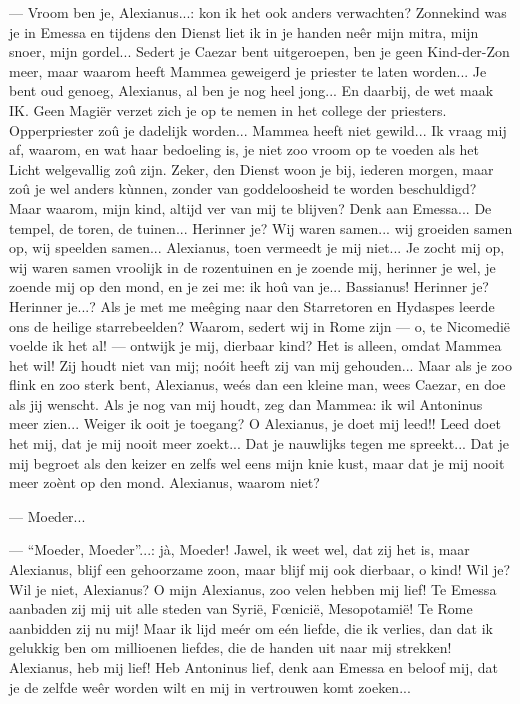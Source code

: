 \documentclass[a4paper, 12pt, oneside, dutch]{article}
\begin{document}
--- Vroom ben je, Alexianus...: kon ik het ook anders verwachten? Zonnekind was je in Emessa en tijdens den Dienst liet ik in je handen neêr mijn mitra, mijn snoer, mijn gordel... Sedert je Caezar bent uitgeroepen, ben je geen Kind-der-Zon meer, maar waarom heeft Mammea geweigerd je priester te laten worden... Je bent oud genoeg, Alexianus, al ben je nog heel jong... En daarbij, de wet maak IK. Geen Magiër verzet zich je op te nemen in het college der priesters. Opperpriester zoû je dadelijk worden... Mammea heeft niet gewild... Ik vraag mij af, waarom, en wat haar bedoeling is, je niet zoo vroom op te voeden als het Licht welgevallig zoû zijn. Zeker, den Dienst woon je bij, iederen morgen, maar zoû je wel anders kùnnen, zonder van goddeloosheid te worden beschuldigd? Maar waarom, mijn kind, altijd ver van mij te blijven? Denk aan Emessa... De tempel, de toren, de tuinen... Herinner je? Wij waren samen... wij groeiden samen op, wij speelden samen... Alexianus, toen vermeedt je mij niet... Je zocht mij op, wij waren samen vroolijk in de rozentuinen en je zoende mij, herinner je wel, je zoende mij op den mond, en je zei me: ik hoû van je... Bassianus! Herinner je? Herinner je...? Als je met me meêging naar den Starretoren en Hydaspes leerde ons de heilige starrebeelden? Waarom, sedert wij in Rome zijn --- o, te Nicomedië voelde ik het al! --- ontwijk je mij, dierbaar kind? Het is alleen, omdat Mammea het wil! Zij houdt niet van mij; noóit heeft zij van mij gehouden... Maar als je zoo flink en zoo sterk bent, Alexianus, weés dan een kleine man, wees Caezar, en doe als jij wenscht. Als je nog van mij houdt, zeg dan Mammea: ik wil Antoninus meer zien... Weiger ik ooit je toegang? O Alexianus, je doet mij leed!! Leed doet het mij, dat je mij nooit meer zoekt... Dat je nauwlijks tegen me spreekt... Dat je mij begroet als den keizer en zelfs wel eens mijn knie kust, maar dat je mij nooit meer zoènt op den mond. Alexianus, waarom niet?

--- Moeder...

--- "`Moeder, Moeder"'...: jà, Moeder! Jawel, ik weet wel, dat zij het is, maar Alexianus, blijf een gehoorzame zoon, maar blijf mij ook dierbaar, o kind! Wil je? Wil je niet, Alexianus? O mijn Alexianus, zoo velen hebben mij lief! Te Emessa aanbaden zij mij uit alle steden van Syrië, Fœnicië, Mesopotamië! Te Rome aanbidden zij nu mij! Maar ik lijd meér om eén liefde, die ik verlies, dan dat ik gelukkig ben om millioenen liefdes, die de handen uit naar mij strekken! Alexianus, heb mij lief! Heb Antoninus lief, denk aan Emessa en beloof mij, dat je de zelfde weêr worden wilt en mij in vertrouwen komt zoeken...
\end{document}
